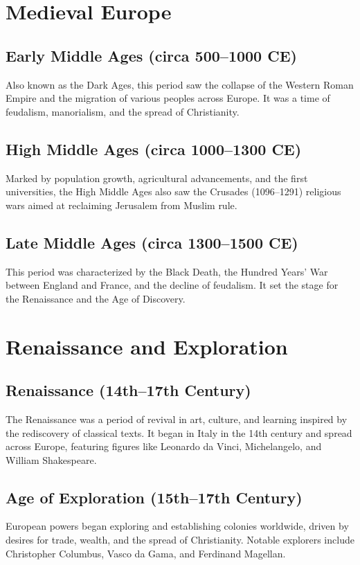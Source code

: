 \documentclass{book}
\begin{document}
\section{Medieval Europe}
\label{sec:medieval-europe}
\subsection{Early Middle Ages (circa 500–1000 CE)}
Also known as the Dark Ages, this period saw the collapse of the Western Roman Empire and the migration of various peoples across Europe. It was a time of feudalism, manorialism, and the spread of Christianity.

\subsection{High Middle Ages (circa 1000–1300 CE)}
Marked by population growth, agricultural advancements, and the first universities, the High Middle Ages also saw the Crusades (1096–1291) religious wars aimed at reclaiming Jerusalem from Muslim rule.

\subsection{Late Middle Ages (circa 1300–1500 CE)}
This period was characterized by the Black Death, the Hundred Years' War between England and France, and the decline of feudalism. It set the stage for the Renaissance and the Age of Discovery.

\section{Renaissance and Exploration}
\label{sec:renaissance-exploration}
\subsection{Renaissance (14th–17th Century)}
The Renaissance was a period of revival in art, culture, and learning inspired by the rediscovery of classical texts. It began in Italy in the 14th century and spread across Europe, featuring figures like Leonardo da Vinci, Michelangelo, and William Shakespeare.

\subsection{Age of Exploration (15th–17th Century)}
European powers began exploring and establishing colonies worldwide, driven by desires for trade, wealth, and the spread of Christianity. Notable explorers include Christopher Columbus, Vasco da Gama, and Ferdinand Magellan.
\end{document}
